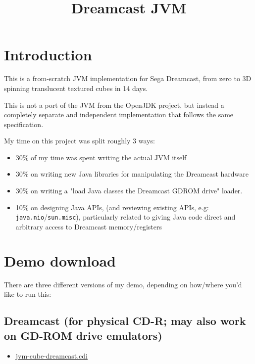 \documentclass[20pt]{article}
\title{Dreamcast JVM}
\date{}
\begin{document}
\maketitle

\tableofcontents
\section{Introduction}

This is a from-scratch JVM implementation for Sega Dreamcast, from zero to
3D spinning translucent textured cubes in 14 days.

This is not a port of the JVM from the OpenJDK project, but instead a completely
separate and independent implementation that follows the same specification.

My time on this project was split roughly 3 ways:

\begin{itemize}
\item 30\% of my time was spent writing the actual JVM itself

\item 30\% on writing new Java libraries for manipulating the Dreamcast hardware

\item 30\% on writing a "load Java classes the Dreamcast GDROM drive" loader.

\item 10\% on designing Java APIs, (and reviewing existing APIs, e.g:
  \texttt{java.nio}/\texttt{sun.misc}), particularly related to giving Java code
  direct and arbitrary access to Dreamcast memory/registers
\end{itemize}

\section{Demo download}

There are three different versions of my demo, depending on how/where you'd like
to run this:

\subsection{Dreamcast (for physical CD-R; may also work on GD-ROM drive emulators)}
\begin{itemize}
\item \href{https://dreamcast.idk.st/jvm/jvm-cube-dreamcast.cdi}{jvm-cube-dreamcast.cdi}
\end{itemize}
\end{document}
